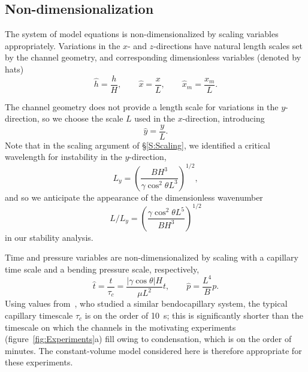 \documentclass{jfm}
\begin{document}
\subsection{Non-dimensionalization}\label{S:Modelling:NonDim}
The system of model equations is non-dimensionalized by scaling variables appropriately. Variations in the $x$- and $z$-directions have natural length scales set by the channel geometry, and corresponding dimensionless variables (denoted by hats)
\begin{equation}\label{E:Modelling:NonDim:SpatialScaling}
\hat{h} = \frac{h}{H}, \qquad \hat{x} = \frac{x}{L}, \qquad \hat{x}_m = \frac{x_m}{L}.
\end{equation}

The channel geometry does not provide a length scale for variations in the $y$-direction, so we choose the scale $L$ used in the $x$-direction, introducing
\begin{equation}\label{E:Modelling:NonDim:yscaling}
\hat{y} = \frac{y}{L}.
\end{equation}
Note that in the scaling argument of \S\ref{S:Scaling}, we identified a critical wavelength for instability in the $y$-direction,
\begin{equation}\label{E:Modelling:NonDim:LengthscaleFromScaling}
L_y = \left(\frac{B H^3}{\gamma  \cos^2 \theta L^3}\right)^{1/2},
\end{equation}
and so we anticipate the appearance of the dimensionless wavenumber
\begin{equation}\label{E:Modelling:NonDim:ExpectedWavenumber}
L/L_y =  \left(\frac{\gamma \cos^2 \theta L^5}{B H^3}\right)^{1/2}
\end{equation}
in our stability analysis.

Time and pressure variables are non-dimensionalized by scaling with a capillary time scale and a bending pressure scale, respectively,
\begin{equation}\label{E:Modelling:NonDim:TimeAndPressureScaling}
\hat{t} =\frac{t}{ \tau_c} =  \frac{|\gamma \cos \theta| H}{\mu L^2}t, \qquad \hat{p} = \frac{L^4}{B}p.
\end{equation}
Using values from~\citet{Bradley2019PRL}, who studied a similar bendocapillary system, the typical capillary timescale $\tau_c$ is on the order of 10~s; this is significantly shorter than the timescale on which the channels in the motivating experiments (figure~\ref{fig:Experiments}a) fill owing to condensation, which is on the order of minutes. The constant-volume model considered here is therefore appropriate for these experiments.
\end{document}
